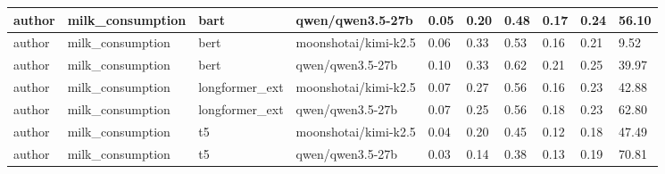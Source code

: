 \begin{tabular}{|l|l|l|l|l|l|l|l|l|l|}
 \hline
 author & milk\_consumption & bart & qwen/qwen3.5-27b & 0.05 & 0.20 & 0.48 & 0.17 & 0.24 & 56.10 \\
 \hline
 author & milk\_consumption & bert & moonshotai/kimi-k2.5 & 0.06 & 0.33 & 0.53 & 0.16 & 0.21 & 9.52 \\
 \hline
 author & milk\_consumption & bert & qwen/qwen3.5-27b & 0.10 & 0.33 & 0.62 & 0.21 & 0.25 & 39.97 \\
 \hline
 author & milk\_consumption & longformer\_ext & moonshotai/kimi-k2.5 & 0.07 & 0.27 & 0.56 & 0.16 & 0.23 & 42.88 \\
 \hline
 author & milk\_consumption & longformer\_ext & qwen/qwen3.5-27b & 0.07 & 0.25 & 0.56 & 0.18 & 0.23 & 62.80 \\
 \hline
 author & milk\_consumption & t5 & moonshotai/kimi-k2.5 & 0.04 & 0.20 & 0.45 & 0.12 & 0.18 & 47.49 \\
 \hline
 author & milk\_consumption & t5 & qwen/qwen3.5-27b & 0.03 & 0.14 & 0.38 & 0.13 & 0.19 & 70.81 \\
\hline
\end{tabular}
